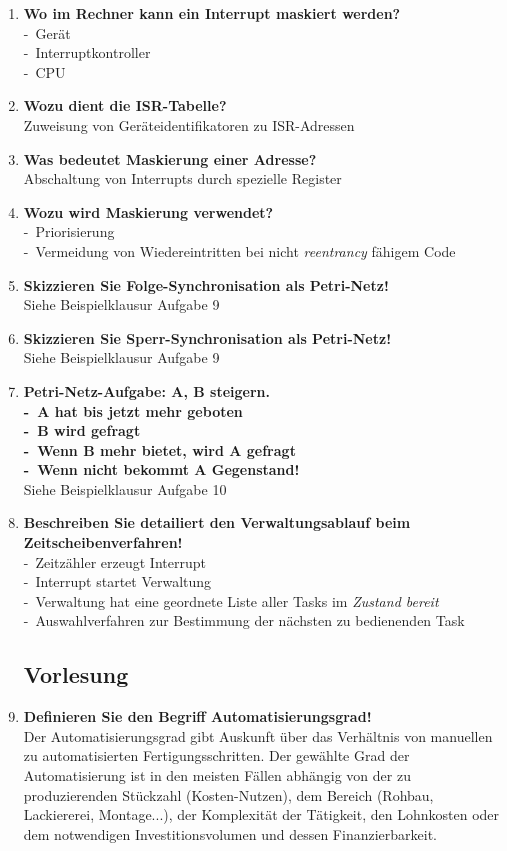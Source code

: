 \documentclass[a4paper,12pt]{article}
\newcommand{\questionnopage}[2]{\pagebreak[3]\item {\textbf{#1?}}#2}
\newcommand{\statementnopage}[2]{\pagebreak[3]\item {\textbf{#1!}}#2}
\newcommand{\catchword}[1]{\\-\ #1}
\newcommand{\normaltext}[1]{\\#1}
\newcommand{\important}[1]{\index{#1}\textit{#1}}
\begin{document}
\begin{enumerate}
  \questionnopage{Wo im Rechner kann ein Interrupt maskiert werden}
  {
    \catchword{Gerät}
    \catchword{Interruptkontroller}
    \catchword{CPU}
  }

  \questionnopage{Wozu dient die ISR-Tabelle}
  {
    \normaltext{Zuweisung von Geräteidentifikatoren zu ISR-Adressen}
  }

  \questionnopage{Was bedeutet Maskierung einer Adresse}
  {
    \normaltext{Abschaltung von Interrupts durch spezielle Register}
  }

  \questionnopage{Wozu wird Maskierung verwendet}
  {
    \catchword{Priorisierung}
    \catchword{Vermeidung von Wiedereintritten bei nicht \important{reentrancy} fähigem Code}
  }

  \statementnopage{Skizzieren Sie Folge-Synchronisation als Petri-Netz}
  {
    \normaltext{Siehe Beispielklausur Aufgabe 9}
  }

  \statementnopage{Skizzieren Sie Sperr-Synchronisation als Petri-Netz}
  {
    \normaltext{Siehe Beispielklausur Aufgabe 9}
  }

  \statementnopage{Petri-Netz-Aufgabe: A, B steigern.
  \catchword{A hat bis jetzt mehr geboten}
  \catchword{B wird gefragt}
  \catchword{Wenn B mehr bietet, wird A gefragt}
  \catchword{Wenn nicht bekommt A Gegenstand}}
  {
    \normaltext{Siehe Beispielklausur Aufgabe 10}
  }

  \statementnopage{Beschreiben Sie detailiert den Verwaltungsablauf beim Zeitscheibenverfahren}
  {
    \catchword{Zeitzähler erzeugt Interrupt}
    \catchword{Interrupt startet Verwaltung}
    \catchword{Verwaltung hat eine geordnete Liste aller Tasks im \important{Zustand bereit}}
    \catchword{Auswahlverfahren zur Bestimmung der nächsten zu bedienenden Task}
  }

  \subsection{Vorlesung}

  \statementnopage{Definieren Sie den Begriff Automatisierungsgrad}  
  {
    \normaltext{Der Automatisierungsgrad gibt Auskunft über das Verhältnis
                von manuellen zu automatisierten Fertigungsschritten.
                Der gewählte Grad der Automatisierung ist in den meisten Fällen abhängig 
                von der zu produzierenden Stückzahl (Kosten-Nutzen), dem Bereich (Rohbau,
                Lackiererei, Montage...), der Komplexität der Tätigkeit, den Lohnkosten
                oder dem notwendigen Investitionsvolumen und dessen Finanzierbarkeit.}
  }


\end{enumerate}
\end{document}
